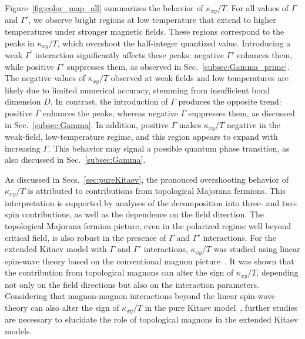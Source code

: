 \documentclass[twocolumn,superscriptaddress,showpacs, longbibliography, aps, prx]{revtex4-2}
\begin{document}
Figure~\ref{fig:color_map_all} summarizes the behavior of $\kappa_{xy}/T$. 
For all values of $\Gamma$ and $\Gamma'$, we observe bright regions at low temperature that extend to higher temperatures under stronger magnetic fields. 
These regions correspond to the peaks in $\kappa_{xy}/T$, which overshoot the half-integer quantized value. 
Introducing a weak $\Gamma^{\prime}$ interaction significantly affects these peaks: 
negative $\Gamma'$ enhances them, while positive $\Gamma'$ suppresses them, as observed in Sec.~\ref{subsec:Gamma_prime}. 
The negative values of $\kappa_{xy}/T$ observed at weak fields and low temperatures are likely due to limited numerical accuracy, stemming from insufficient bond dimension $D$. 
In contrast, the introduction of $\Gamma$ produces the opposite trend:
positive $\Gamma$ enhances the peaks, whereas negative $\Gamma$ suppresses them, as discussed in Sec.~\ref{subsec:Gamma}.
In addition, positive $\Gamma$ makes $\kappa_{xy}/T$ negative in the weak-field, low-temperature regime, and this region appears to expand with increasing $\Gamma$. 
This behavior may signal a possible quantum phase transition, as also discussed in Sec.~\ref{subsec:Gamma}. 

As discussed in Secs.~\ref{sec:pureKitaev}, the pronouced overshooting behavior of $\kappa_{xy}/T$ is attributed to contributions from topological Majorana fermions. 
This interpretation is supported by analyses of the decomposition into three- and two-spin contributions, as well as the dependence on the field direction. 
The topological Majorana fermion picture, even in the polarized regime well beyond critical field, is also robust in the presence of $\Gamma$ and $\Gamma'$ interactions. 
For the extended Kitaev model with $\Gamma$ and $\Gamma'$ interactions, $\kappa_{xy}/T$ was studied using linear spin-wave theory based on the conventional magnon picture~\cite{ChernZK2021,ZhangCK2021}. 
It was shown that the contribution from topological magnons can alter the sign of $\kappa_{xy}/T$, depending not only on the field directions but also on the interaction parameters. 
Considering that magnon-magnon interactions beyond the linear spin-wave theory can also alter the sign of $\kappa_{xy}/T$ in the pure Kitaev model~\cite{Koyama2024}, further studies are necessary to elucidate the role of topological magnons in the extended Kitaev models.
\end{document}
